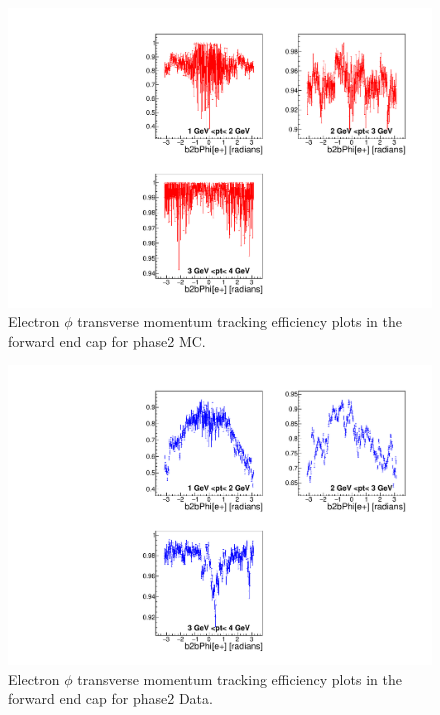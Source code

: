 \documentclass[a4paper,11pt,twosided,final,german,openbib,pdftex,listof=totoc,bibliography=totoc]{scrbook}
\begin{document}
\begin{appendix}
\begin{figure}[!htbp]
	\centering
	\includegraphics[width=\textwidth]{Plots/master/xPtMPhiemFC_MC}
	\caption[Transverse Momentum $\phi$ Electron Forward End Cap Efficiency Phase2 MC]{Electron $\phi$ transverse momentum tracking efficiency plots in the forward end cap for phase2 MC.}
	\label{plt:PtMPhiemFC_MC}
\end{figure}


\begin{figure}[!htbp]
	\centering
	\includegraphics[width=\textwidth]{Plots/master/xPtMPhiemFC_Data}
	\caption[Transverse Momentum $\phi$ Electron Forward End Cap Efficiency Phase2 Data]{Electron $\phi$ transverse momentum tracking efficiency plots in the forward end cap for phase2 Data.}
	\label{plt:PtMPhiemFC_Data}
\end{figure}








\end{appendix}
\end{document}
